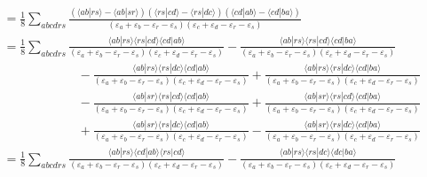 \documentclass[a4paper]{book}
\newcounter{solution}[chapter]
\begin{document}
\begin{solution}
\begin{align*}
		&= \frac{1}{8} \sum_{abcdrs} \frac{ ( \langle ab | rs \rangle - \langle ab | sr \rangle )( \langle rs | cd \rangle - \langle rs | dc \rangle ) ( \langle cd | ab \rangle - \langle cd | ba \rangle ) }{ ( \varepsilon_a + \varepsilon_b - \varepsilon_r - \varepsilon_s ) ( \varepsilon_c + \varepsilon_d - \varepsilon_r - \varepsilon_s ) } \\
		&= \frac{1}{8} \sum_{abcdrs} \frac{ \langle ab | rs \rangle \langle rs | cd \rangle \langle cd | ab \rangle }{ ( \varepsilon_a + \varepsilon_b - \varepsilon_r - \varepsilon_s ) ( \varepsilon_c + \varepsilon_d - \varepsilon_r - \varepsilon_s ) } - \frac{ \langle ab | rs \rangle \langle rs | cd \rangle \langle cd | ba \rangle }{ ( \varepsilon_a + \varepsilon_b - \varepsilon_r - \varepsilon_s ) ( \varepsilon_c + \varepsilon_d - \varepsilon_r - \varepsilon_s ) } \\
		&\hspace{6em} - \frac{ \langle ab | rs \rangle \langle rs | dc \rangle \langle cd | ab \rangle }{ ( \varepsilon_a + \varepsilon_b - \varepsilon_r - \varepsilon_s ) ( \varepsilon_c + \varepsilon_d - \varepsilon_r - \varepsilon_s ) } + \frac{ \langle ab | rs \rangle \langle rs | dc \rangle \langle cd | ba \rangle }{ ( \varepsilon_a + \varepsilon_b - \varepsilon_r - \varepsilon_s ) ( \varepsilon_c + \varepsilon_d - \varepsilon_r - \varepsilon_s ) } \\
		&\hspace{6em} - \frac{ \langle ab | sr \rangle \langle rs | cd \rangle \langle cd | ab \rangle }{ ( \varepsilon_a + \varepsilon_b - \varepsilon_r - \varepsilon_s ) ( \varepsilon_c + \varepsilon_d - \varepsilon_r - \varepsilon_s ) } + \frac{ \langle ab | sr \rangle \langle rs | cd \rangle \langle cd | ba \rangle }{ ( \varepsilon_a + \varepsilon_b - \varepsilon_r - \varepsilon_s ) ( \varepsilon_c + \varepsilon_d - \varepsilon_r - \varepsilon_s ) } \\
		&\hspace{6em} + \frac{ \langle ab | sr \rangle \langle rs | dc \rangle \langle cd | ab \rangle }{ ( \varepsilon_a + \varepsilon_b - \varepsilon_r - \varepsilon_s ) ( \varepsilon_c + \varepsilon_d - \varepsilon_r - \varepsilon_s ) } - \frac{ \langle ab | sr \rangle \langle rs | dc \rangle \langle cd | ba \rangle }{ ( \varepsilon_a + \varepsilon_b - \varepsilon_r - \varepsilon_s ) ( \varepsilon_c + \varepsilon_d - \varepsilon_r - \varepsilon_s ) } \\
		&= \frac{1}{8} \sum_{abcdrs} \frac{ \langle ab | rs \rangle \langle cd | ab \rangle \langle rs | cd \rangle }{ ( \varepsilon_a + \varepsilon_b - \varepsilon_r - \varepsilon_s ) ( \varepsilon_c + \varepsilon_d - \varepsilon_r - \varepsilon_s ) } - \frac{ \langle ab | rs \rangle \langle rs | dc \rangle \langle dc | ba \rangle }{ ( \varepsilon_a + \varepsilon_b - \varepsilon_r - \varepsilon_s ) ( \varepsilon_c + \varepsilon_d - \varepsilon_r - \varepsilon_s ) } \\

\end{align*}
\end{solution}
\end{document}
